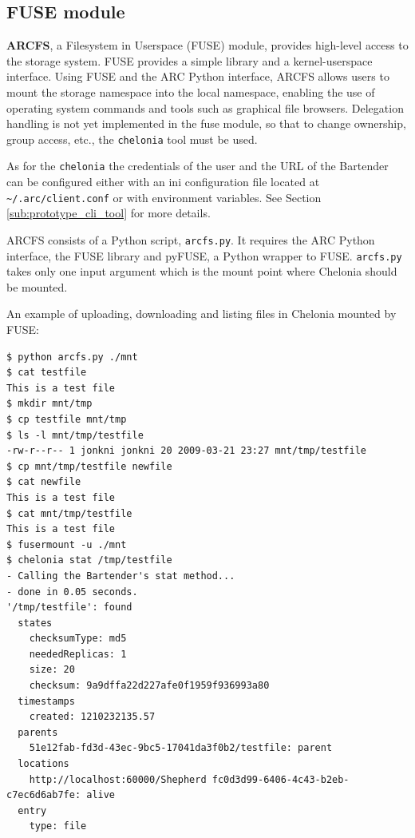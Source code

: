 \documentclass{book}
\begin{document}

\subsection{FUSE module} %
\label{sub:fuse_module}

\textbf{ARCFS}, a Filesystem in Userspace (FUSE) module, provides high-level access to the storage system. FUSE provides a simple library and a kernel-userspace interface. Using FUSE and the ARC Python interface, ARCFS allows users to mount the storage namespace into the local namespace, enabling the use of operating system commands and tools such as graphical file browsers. Delegation handling is not yet implemented in the fuse module, so that to change ownership, group access, etc., the \verb!chelonia! tool must be used.

As for the \verb!chelonia! the credentials of the user and the URL of
the Bartender can be configured either with an ini configuration file located at \verb!~/.arc/client.conf! or with environment variables. See Section \ref{sub:prototype_cli_tool} for more details.

ARCFS consists of a Python script, \verb!arcfs.py!. It requires the ARC Python interface, the FUSE library and pyFUSE, a Python wrapper to FUSE. \verb!arcfs.py! takes only one input argument which is the mount point where Chelonia should be mounted.

An example of uploading, downloading and listing files in Chelonia mounted by FUSE:

\begin{verbatim}
$ python arcfs.py ./mnt
$ cat testfile
This is a test file
$ mkdir mnt/tmp
$ cp testfile mnt/tmp
$ ls -l mnt/tmp/testfile
-rw-r--r-- 1 jonkni jonkni 20 2009-03-21 23:27 mnt/tmp/testfile
$ cp mnt/tmp/testfile newfile
$ cat newfile
This is a test file
$ cat mnt/tmp/testfile
This is a test file
$ fusermount -u ./mnt
$ chelonia stat /tmp/testfile
- Calling the Bartender's stat method...
- done in 0.05 seconds.
'/tmp/testfile': found
  states
    checksumType: md5
    neededReplicas: 1
    size: 20
    checksum: 9a9dffa22d227afe0f1959f936993a80
  timestamps
    created: 1210232135.57
  parents
    51e12fab-fd3d-43ec-9bc5-17041da3f0b2/testfile: parent
  locations
    http://localhost:60000/Shepherd fc0d3d99-6406-4c43-b2eb-c7ec6d6ab7fe: alive
  entry
    type: file
\end{verbatim}

\end{document}
